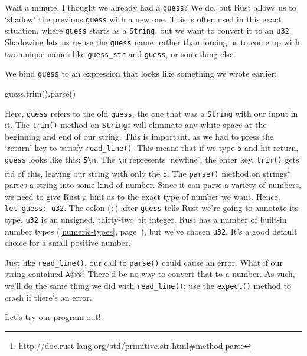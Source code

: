 \documentclass[a4paper,]{book}
\renewcommand*{\hyperlink}[2]{%
 #2 (\autoref{#1}, page~\pageref{#1})}
\newenvironment{Shaded}{\begin{snugshade}}{\end{snugshade}}
\newcommand{\KeywordTok}[1]{\textcolor[rgb]{0.13,0.29,0.53}{\textbf{{#1}}}}
\newcommand{\NormalTok}[1]{{#1}}
\renewcommand{\href}[2]{#2\footnote{\url{#1}}}
\begin{document}
Wait a minute, I thought we already had a \texttt{guess}? We do, but
Rust allows us to `shadow' the previous \texttt{guess} with a new one.
This is often used in this exact situation, where \texttt{guess} starts
as a \texttt{String}, but we want to convert it to an \texttt{u32}.
Shadowing lets us re-use the \texttt{guess} name, rather than forcing us
to come up with two unique names like \texttt{guess\_str} and
\texttt{guess}, or something else.

We bind \texttt{guess} to an expression that looks like something we
wrote earlier:

\begin{Shaded}
\begin{Highlighting}[]
\NormalTok{guess.trim().parse()}
\end{Highlighting}
\end{Shaded}

Here, \texttt{guess} refers to the old \texttt{guess}, the one that was
a \texttt{String} with our input in it. The \texttt{trim()} method on
\texttt{String}s will eliminate any white space at the beginning and end
of our string. This is important, as we had to press the `return' key to
satisfy \texttt{read\_line()}. This means that if we type \texttt{5} and
hit return, \texttt{guess} looks like this: \texttt{5\textbackslash{}n}.
The \texttt{\textbackslash{}n} represents `newline', the enter key.
\texttt{trim()} gets rid of this, leaving our string with only the
\texttt{5}. The
\href{http://doc.rust-lang.org/std/primitive.str.html\#method.parse}{\texttt{parse()}
method on strings} parses a string into some kind of number. Since it
can parse a variety of numbers, we need to give Rust a hint as to the
exact type of number we want. Hence, \texttt{let\ guess:\ u32}. The
colon (\texttt{:}) after \texttt{guess} tells Rust we're going to
annotate its type. \texttt{u32} is an unsigned, thirty-two bit integer.
Rust has \protect\hyperlink{numeric-types}{a number of built-in number
types}, but we've chosen \texttt{u32}. It's a good default choice for a
small positive number.

Just like \texttt{read\_line()}, our call to \texttt{parse()} could
cause an error. What if our string contained \texttt{A👍\%}? There'd be
no way to convert that to a number. As such, we'll do the same thing we
did with \texttt{read\_line()}: use the \texttt{expect()} method to
crash if there's an error.

Let's try our program out!

\begin{Shaded}
\end{Shaded}
\end{document}
